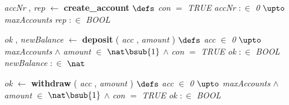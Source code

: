 \vspace{-4.5ex}\bsetindent
\begin{tabbing}
\bSetTabs
\+\>
%
%
{\em accNr\/} , {\em rep\/} $\longleftarrow$  {\bf { create\_account}}  \bhsp $\defs$ \+ \bnl
  \+\bnl
{\em con\/} $=$ {\em TRUE\/} \-\bnl
{} \+\bnl
{\em accNr\/} $:\in$ {\em 0\/} $\upto$ {\em maxAccounts\/}\label{maxAccounts}  \bparallel \bnl
{\em rep\/} $:\in$ {\em BOOL\/}\label{BOOL}  \-\bnl
{}  \- \bOperationSemiColon 
\end{tabbing}
\bresetindent
%
%
\vspace{-4.5ex}\bsetindent
\begin{tabbing}
\bSetTabs
\+\>
%
%
{\em ok\/} , {\em newBalance\/} $\longleftarrow$  {\bf { deposit}} ( {\em acc\/} , {\em amount\/} ) \bhsp $\defs$ \+ \bnl
  \+\bnl
{\em acc\/} $\in$ {\em 0\/} $\upto$ {\em maxAccounts\/}\label{maxAccounts}  $\wedge$ \bnl
{\em amount\/} $\in$  $\nat\bsub{1}$  $\wedge$ \bnl
{\em con\/} $=$ {\em TRUE\/} \-\bnl
{} \+\bnl
{\em ok\/} $:\in$ {\em BOOL\/}\label{BOOL}  \bparallel \bnl
{\em newBalance\/} $:\in$  $\nat$  \-\bnl
{}  \- \bOperationSemiColon 
\end{tabbing}
\bresetindent
%
%
\vspace{-4.5ex}\bsetindent
\begin{tabbing}
\bSetTabs
\+\>
%
%
{\em ok\/} $\longleftarrow$  {\bf { withdraw}} ( {\em acc\/} , {\em amount\/} ) \bhsp $\defs$ \+ \bnl
  \+\bnl
{\em acc\/} $\in$ {\em 0\/} $\upto$ {\em maxAccounts\/}\label{maxAccounts}  $\wedge$ \bnl
{\em amount\/} $\in$  $\nat\bsub{1}$  $\wedge$ \bnl
{\em con\/} $=$ {\em TRUE\/} \-\bnl
{} \+\bnl
{\em ok\/} $:\in$ {\em BOOL\/}\label{BOOL}  \-\bnl
{}  \- \bOperationSemiColon 
\end{tabbing}
